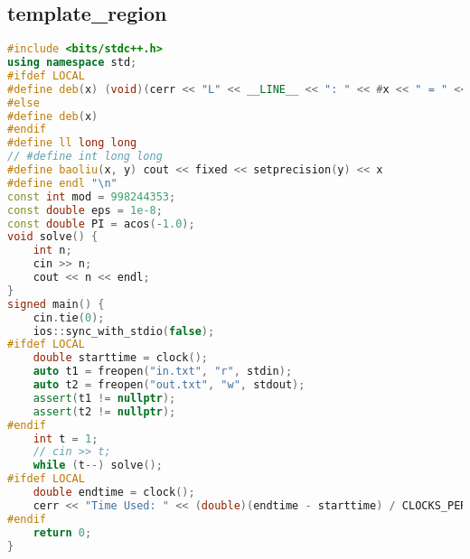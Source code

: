 \subsection{template\_region}
\begin{lstlisting}[language=C++]
#include <bits/stdc++.h>
using namespace std;
#ifdef LOCAL
#define deb(x) (void)(cerr << "L" << __LINE__ << ": " << #x << " = " << (x) << endl)
#else
#define deb(x)
#endif
#define ll long long
// #define int long long
#define baoliu(x, y) cout << fixed << setprecision(y) << x
#define endl "\n"
const int mod = 998244353;
const double eps = 1e-8;
const double PI = acos(-1.0);
void solve() {
    int n;
    cin >> n;
    cout << n << endl;
}
signed main() {
    cin.tie(0);
    ios::sync_with_stdio(false);
#ifdef LOCAL
    double starttime = clock();
    auto t1 = freopen("in.txt", "r", stdin);
    auto t2 = freopen("out.txt", "w", stdout);
    assert(t1 != nullptr);
    assert(t2 != nullptr);
#endif
    int t = 1;
    // cin >> t;
    while (t--) solve();
#ifdef LOCAL
    double endtime = clock();
    cerr << "Time Used: " << (double)(endtime - starttime) / CLOCKS_PER_SEC * 1000 << " ms" << endl;
#endif
    return 0;
}
\end{lstlisting}

